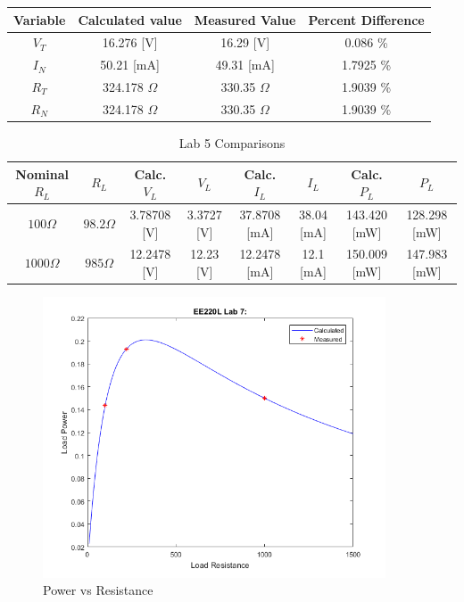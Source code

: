 \documentclass{article}
\begin{document}
\begin{table}[h]
\begin{center}
\label{code:resis}
\begin{tabular}{c|c|c|c}
Variable	&	Calculated value	&	Measured Value	&	Percent Difference	\\\hline
$V_T$	&	16.276	[V] &	16.29	[V] &	0.086	\% \\
$I_N$	&	50.21	[mA] &	49.31	[mA] &	1.7925	\% \\
$R_T$	&	324.178	$\Omega$ &	330.35	$\Omega$ &	1.9039	\% \\
$R_N$	&	324.178	$\Omega$ &	330.35	$\Omega$ &	1.9039	\% \\

\end{tabular}
\end{center}

\end{table}

\pagebreak


\begin{table}[h]
\begin{center}
\label{code:resis}
\caption{Lab 5 Comparisons}
\begin{tabular}{c|c|c|c|c|c|c|c}
 Nominal $R_L$	&	$R_L$	&	Calc. $V_L$	& $V_L$	&	Calc. $I_L$	&	$I_L$	&	Calc.  $P_L$	&	$P_L$	\\\hline
$100	\Omega$ &	$98.2	\Omega$ &	3.78708	[V] &	3.3727	[V] &	37.8708	[mA] &	38.04	[mA] &	143.420	[mW] &	128.298	[mW] \\
$1000	\Omega $&	$985	\Omega$ &	12.2478	[V] &	12.23	[V] &	12.2478	[mA] &	12.1	[mA] &	150.009	[mW] &	147.983	[mW] \\


\end{tabular}
\end{center}

\end{table}

\begin{figure}[h]
  \includegraphics[width=4in]{lab7.png}
  \caption{Power vs Resistance}
  \label{fig:4a}
\end{figure}






\begin{lstlisting}

\end{lstlisting}
\end{document}
